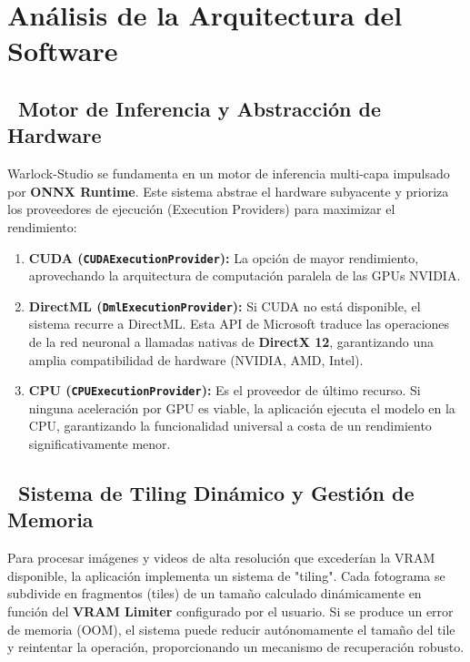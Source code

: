 \documentclass[11pt, a4paper]{article}
\newcommand{\SectionColor}{WarlockGray} %
\newcommand{\setsectioncolor}[1]{\renewcommand{\SectionColor}{#1}}
\begin{document}
\setsectioncolor{ArchColor}
\section{Análisis de la Arquitectura del Software}

\subsection{\faCogs\ Motor de Inferencia y Abstracción de Hardware}
Warlock-Studio se fundamenta en un motor de inferencia multi-capa impulsado por \textbf{ONNX Runtime}. Este sistema abstrae el hardware subyacente y prioriza los proveedores de ejecución (Execution Providers) para maximizar el rendimiento:
\begin{enumerate}[leftmargin=*]
    \item \textbf{CUDA (\texttt{CUDAExecutionProvider}):} La opción de mayor rendimiento, aprovechando la arquitectura de computación paralela de las GPUs NVIDIA.
    \item \textbf{DirectML (\texttt{DmlExecutionProvider}):} Si CUDA no está disponible, el sistema recurre a DirectML. Esta API de Microsoft traduce las operaciones de la red neuronal a llamadas nativas de \textbf{DirectX 12}, garantizando una amplia compatibilidad de hardware (NVIDIA, AMD, Intel).
    \item \textbf{CPU (\texttt{CPUExecutionProvider}):} Es el proveedor de último recurso. Si ninguna aceleración por GPU es viable, la aplicación ejecuta el modelo en la CPU, garantizando la funcionalidad universal a costa de un rendimiento significativamente menor.
\end{enumerate}

\subsection{\faThLarge\ Sistema de Tiling Dinámico y Gestión de Memoria}
Para procesar imágenes y videos de alta resolución que excederían la VRAM disponible, la aplicación implementa un sistema de "tiling". Cada fotograma se subdivide en fragmentos (tiles) de un tamaño calculado dinámicamente en función del \textbf{VRAM Limiter} configurado por el usuario. Si se produce un error de memoria (OOM), el sistema puede reducir autónomamente el tamaño del tile y reintentar la operación, proporcionando un mecanismo de recuperación robusto.
\end{document}
